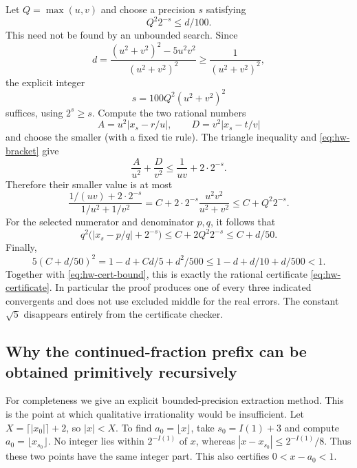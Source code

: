 Let \(Q=\max(u,v)\) and choose a precision \(s\) satisfying
\begin{equation}\label{eq:hw-precision}
 Q^2 2^{-s}\le d/100.
\end{equation}
This need not be found by an unbounded search.  Since
\[
 d=\frac{(u^2+v^2)^2-5u^2v^2}{(u^2+v^2)^2}
 \ge\frac1{(u^2+v^2)^2},
\]
the explicit integer
\[
 s=100Q^2(u^2+v^2)^2
\]
suffices, using \(2^s\ge s\).
Compute the two rational numbers
\[
 A=u^2|x_s-r/u|,\qquad D=v^2|x_s-t/v|
\]
and choose the smaller (with a fixed tie rule).  The triangle inequality
and \eqref{eq:hw-bracket} give
\[
 \frac A{u^2}+\frac D{v^2}
 \le\frac1{uv}+2\cdot2^{-s}.
\]
Therefore their smaller value is at most
\[
 \frac{1/(uv)+2\cdot2^{-s}}{1/u^2+1/v^2}
 =C+2\cdot2^{-s}\frac{u^2v^2}{u^2+v^2}
 \le C+Q^2 2^{-s}.
\]
For the selected numerator and denominator \(p,q\), it follows that
\begin{equation}\label{eq:hw-cert-bound}
 q^2\bigl(|x_s-p/q|+2^{-s}\bigr)
 \le C+2Q^2 2^{-s}\le C+d/50.
\end{equation}
Finally,
\[
 5(C+d/50)^2
 =1-d+Cd/5+d^2/500
 \le1-d+d/10+d/500<1.
\]
Together with \eqref{eq:hw-cert-bound}, this is exactly the rational
certificate \eqref{eq:hw-certificate}.  In particular the proof produces
one of every three indicated convergents and does not use excluded middle
for the real errors.  The constant \(\sqrt5\) disappears entirely from
the certificate checker.

\subsection{Why the continued-fraction prefix can be obtained primitively recursively}

For completeness we give an explicit bounded-precision extraction method.
This is the point at which qualitative irrationality would be insufficient.
Let \(X=\lceil|x_0|\rceil+2\), so \(|x|<X\).
To find \(a_0=\lfloor x\rfloor\), take
\(s_0=I(1)+3\) and compute \(a_0=\lfloor x_{s_0}\rfloor\).
No integer lies within \(2^{-I(1)}\) of \(x\), whereas
\(|x-x_{s_0}|\le2^{-I(1)}/8\).  Thus these two points have the same
integer part.  This also certifies \(0<x-a_0<1\).

